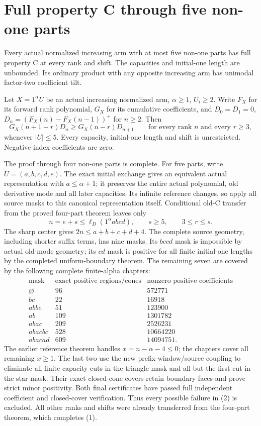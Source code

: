 \section{Full property C through five non-one parts}
\begin{theorem}
Every actual normalized increasing arm with at most five non-one parts
has full property C at every rank and shift. The capacities and initial-one
length are unbounded. Its ordinary product with any opposite increasing
arm has unimodal factor-two coefficient tilt.
\end{theorem}

Let $X=1^\alpha U$ be an actual increasing normalized arm, $\alpha\ge1$,
$U_i\ge2$. Write $F_X$ for its forward rank polynomial, $G_X$ for
its cumulative coefficients, and $D_0=D_1=0$,
$D_n=(F_X(n)-F_X(n-1))^+$ for $n\ge2$.
Then
\[
 G_X(n+1-r)D_n\ge G_X(n-r)D_{n+1}
       \qquad\text{for every rank $n$ and every $r\ge3$},
                                                               \tag{1}
\]
whenever $|U|\le5$. Every capacity, initial-one length and shift is
unrestricted. Negative-index coefficients are zero.

The proof through four non-one parts is complete. For five parts,
write $U=(a,b,c,d,e)$. The exact initial exchange gives an equivalent
actual representation with $a\le\alpha+1$; it preserves the entire
actual polynomial, old derivative mode and all later capacities.
Its infinite reference changes, so apply all source masks to this
canonical representation itself. Conditional old-C transfer from the
proved four-part theorem leaves only
\[
        n=e+s\le\ell_D(1^\alpha abcd),\qquad
        s\ge5,\qquad3\le r\le s.                         \tag{2}
\]
The sharp center gives $2n\le a+b+c+d+4$.
The complete source geometry, including shorter suffix terms, has
nine masks. Its $bccd$ mask is impossible by actual old-mode geometry;
its $cd$ mask is positive for all finite initial-one lengths by the
completed uniform-boundary theorem. The remaining seven are covered by
the following complete finite-alpha chapters:
\[
\begin{array}{c|c|c}
\text{mask}&\text{exact positive regions/cones}&\text{nonzero positive coefficients}\\\hline
\varnothing&96&572771\\
bc&22&16918\\
abbc&51&123900\\
ab&109&1301782\\
abac&209&2526231\\
abacbc&528&10664220\\
abacad&609&14094751.
\end{array}
\]
The earlier reference theorem handles $x=n-\alpha-4\le0$;
the chapters cover all remaining $x\ge1$. The last two use the
new prefix-window/source coupling to eliminate all finite capacity
cuts in the triangle mask and all but the first cut in the star mask.
Their exact closed-cone covers retain boundary faces and prove strict
minor positivity. Both final certificates have passed full independent
coefficient and closed-cover verification. Thus every possible failure
in (2) is excluded. All other
ranks and shifts were already transferred from the four-part theorem,
which completes (1).

